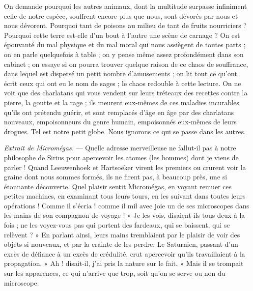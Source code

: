 \documentclass[a4paper, 11pt, oneside, landscape]{article}
\begin{document}
On demande pourquoi les autres animaux, dont la multitude surpasse infiniment celle de notre espèce, souffrent encore plus que nous, sont dévorés par nous et nous dévorent. Pourquoi tant de poisons au milieu de tant de fruits nourriciers ? Pourquoi cette terre est-elle d'un bout à l'autre une scène de carnage ? On est épouvanté du mal physique et du mal moral qui nous assiègent de toutes parts ; on en parle quelquefois à table ; on y pense même assez profondément dans son cabinet ; on essaye si on pourra trouver quelque raison de ce chaos de souffrance, dans lequel est dispersé un petit nombre d'amusements ; on lit tout ce qu'ont écrit ceux qui ont eu le nom de sages ; le chaos redouble à cette lecture. On ne voit que des charlatans qui vous vendent sur leurs tréteaux des recettes contre la pierre, la goutte et la rage ; ils meurent eux-mêmes de ces maladies incurables qu'ils ont prétendu guérir, et sont remplacés d'âge en âge par des charlatans nouveaux, empoisonneurs du genre humain, empoisonnés eux-mêmes de leurs drogues. Tel est notre petit globe. Nous ignorons ce qui se passe dans les autres.

\emph{Extrait de Micromégas.} --- Quelle adresse merveilleuse ne fallut-il pas à notre philosophe de Sirius pour apercevoir les atomes (les hommes) dont je viens de parler ! Quand Leeuwenhoek et Hartsoëker virent les premiers ou crurent voir la graine dont nous sommes formés, ils ne firent pas, à beaucoup près, une si étonnante découverte. Quel plaisir sentit Micromégas, en voyant remuer ces petites machines, en examinant tous leurs tours, en les suivant dans toutes leurs opérations ! Comme il s'écria ! comme il mil avec joie un de ses microscopes dans les mains de son compagnon de voyage ! « Je les vois, disaient-ils tous deux à la fois ; ne les voyez-vous pas qui portent des fardeaux, qui se baissent, qui se relèvent ? » En parlant ainsi, leurs mains tremblaient par le plaisir de voir des objets si nouveaux, et par la crainte de les perdre. Le Saturnien, passant d'un excès de défiance à un excès de crédulité, crut apercevoir qu'ils travaillaient à la propagation. « Ah ! disait-il, j'ai pris la nature sur le fait. » Mais il se trompait sur les apparences, ce qui n'arrive que trop, soit qu'on se serve ou non du microscope.
\end{document}
